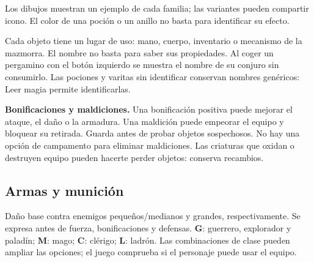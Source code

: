 
Los dibujos muestran un ejemplo de cada familia; las variantes pueden compartir icono. El color de una poción o un anillo no basta para identificar su efecto.

Cada objeto tiene un lugar de uso: mano, cuerpo, inventario o mecanismo de la mazmorra. El nombre no basta para saber sus propiedades. Al coger un pergamino con el botón izquierdo se muestra el nombre de su conjuro sin consumirlo. Las pociones y varitas sin identificar conservan nombres genéricos: Leer magia permite identificarlas.

\textbf{Bonificaciones y maldiciones.} Una bonificación positiva puede mejorar el ataque, el daño o la armadura. Una maldición puede empeorar el equipo y bloquear su retirada. Guarda antes de probar objetos sospechosos. No hay una opción de campamento para eliminar maldiciones. Las criaturas que oxidan o destruyen equipo pueden hacerte perder objetos: conserva recambios.

\subsection*{Armas y munición}

Daño base contra enemigos pequeños/medianos y grandes, respectivamente. Se expresa antes de fuerza, bonificaciones y defensas. \textbf{G}: guerrero, explorador y paladín; \textbf{M}: mago; \textbf{C}: clérigo; \textbf{L}: ladrón. Las combinaciones de clase pueden ampliar las opciones; el juego comprueba si el personaje puede usar el equipo.

